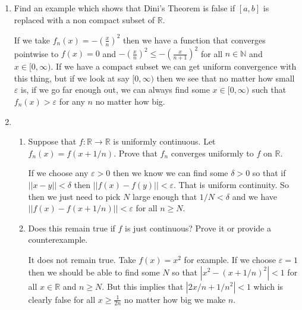 \documentclass[letterpaper]{article}
\begin{document}
\begin{enumerate}
  {\sc Hint}: Work with $g_n=f-f_n$ which decrease to $0$. Show that for any point $x_0$ and $\varepsilon>0$, there are an integer $N$ and a positive $r>0$ such that $g_N(x)\le \varepsilon$ on $(x_0-r,x_0+r)$. If convergence is not uniform, say $\lim||g_n||_\infty =d>0$, find $x_n$ such that $\lim g_n(x_n)=d$. Obtain a contradiction.

  If we can show that $g_n=f-f_n$ converges uniformly to $g=0$ then we will have an equivalent result. Naturally if $f$ and $f_n$ are continuous functions, then $g_n$ must also be continuous. Thus we know that for any $\varepsilon>0$ and $x_0\in [a,b]$ we can find some $r>0$ and $N$ for all $x$ such that $|x-x_0|<r$ will satisfy $|g_N(x)-g_N(x_0)|<\varepsilon$. That is to say we can find some range $(x_0-r,x_0+r)$ where $g_N(x)\le \varepsilon$. And because $g_n$ is monotonic, then $g_k(x)\le \varepsilon$ for all $k\ge N$ and $x\in (x_0-r, x_0+r)$
\item
  Find an example which shows that Dini's Theorem is false if $[a,b]$ is replaced with a non compact subset of $\mathbb{R}$.

  If we take $f_n(x)=-\left(\frac{x}{n}\right)^2$ then we have a function that converges pointwise to $f(x)=0$ and $-\left(\frac{x}{n}\right)^2\le -\left(\frac{x}{n+1}\right)^2$ for all $n\in \mathbb{N}$ and $x\in [0,\infty)$. If we have a compact subset we can get uniform convergence with this thing, but if we look at say $[0,\infty)$ then we see that no matter how small $\varepsilon$ is, if we go far enough out, we can always find some $x\in [0,\infty)$ such that $f_n(x)> \varepsilon$ for any $n$ no matter how big.
\item
  \begin{enumerate}
  \item
    Suppose that $f:\mathbb{R}\to \mathbb{R}$ is uniformly continuous. Let $f_n(x)=f(x+1/n)$. Prove that $f_n$ converges uniformly to $f$ on $\mathbb{R}$.

    If we choose any $\varepsilon>0$ then we know we can find some $\delta>0$ so that if $||x-y||<\delta$ then $||f(x)-f(y)||<\varepsilon$. That is uniform continuity. So then we just need to pick $N$ large enough that $1/N<\delta$ and we have $||f(x)-f(x+1/n)||<\varepsilon$ for all $n\ge N$.
  \item
    Does this remain true if $f$ is just continuous? Prove it or provide a counterexample.

    It does not remain true. Take $f(x)=x^2$ for example. If we choose $\varepsilon=1$ then we should be able to find some $N$ so that $|x^2-(x+1/n)^2|<1$ for all $x\in \mathbb{R}$ and $n\ge N$. But this implies that $|2x/n+1/n^2|<1$ which is clearly false for all $x\ge\frac{1}{2n}$ no matter how big we make $n$.
  \end{enumerate}
\end{enumerate}
\end{document}
